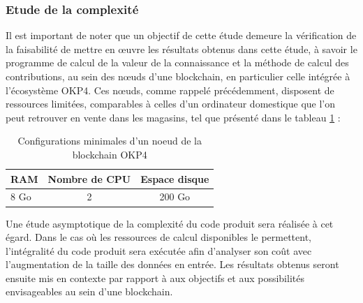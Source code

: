 \subsubsection{Etude de la complexité} \label{subsubsec:complex}

Il est important de noter que un objectif de cette étude demeure la vérification de la faisabilité de mettre en œuvre les résultats obtenus dans cette étude, à savoir le programme de calcul de la valeur de la connaissance et la méthode de calcul des contributions, au sein des nœuds d'une blockchain, en particulier celle intégrée à l'écosystème OKP4. Ces nœuds, comme rappelé précédemment, disposent de ressources limitées, comparables à celles d'un ordinateur domestique que l'on peut retrouver en vente dans les magasins, tel que présenté dans le tableau \ref{table:config_min} :

\begin{table}[H]
\centering
\begin{tabular}{l c c}
\toprule
RAM & Nombre de CPU & Espace disque \\
\midrule
8 Go & 2 & 200 Go\\
\bottomrule
\end{tabular}
\caption{Configurations minimales d'un noeud de la blockchain OKP4}
\label{table:config_min}
\end{table}

Une étude asymptotique de la complexité du code produit sera réalisée à cet égard. Dans le cas où les ressources de calcul disponibles le permettent, l'intégralité du code produit sera exécutée afin d'analyser son coût avec l'augmentation de la taille des données en entrée. Les résultats obtenus seront ensuite mis en contexte par rapport à aux objectifs et aux possibilités envisageables au sein d'une blockchain.

\newpage
